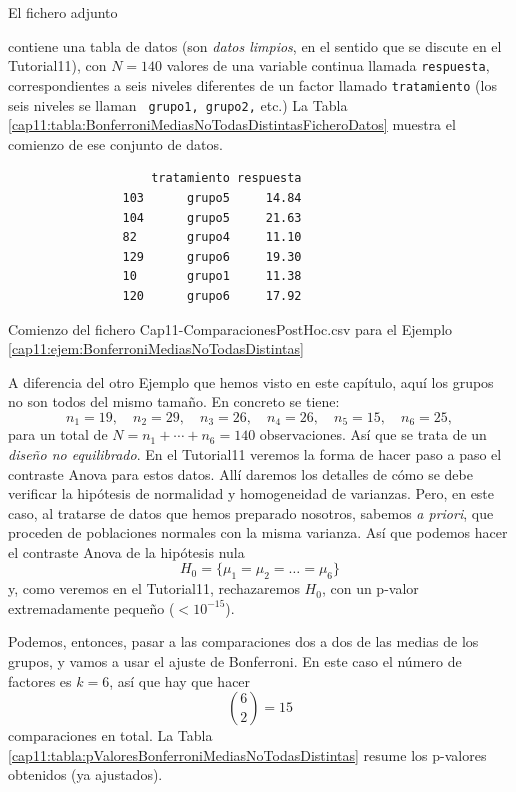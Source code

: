 \begin{ejemplo}
\label{cap11:ejem:BonferroniMediasNoTodasDistintas}

El fichero adjunto
\begin{center}
\end{center}
contiene una tabla de datos (son {\em datos limpios}, en el sentido que se discute en el
Tutorial11), con $N=140$ valores de una variable continua llamada {\tt respuesta}, correspondientes
a seis niveles diferentes de un factor llamado {\tt tratamiento} (los seis niveles se llaman {\tt
grupo1, grupo2,} etc.) La Tabla \ref{cap11:tabla:BonferroniMediasNoTodasDistintasFicheroDatos}
muestra el comienzo de ese conjunto de datos.

\begin{table}[ht]
\begin{verbatim}
                    tratamiento respuesta
                103      grupo5     14.84
                104      grupo5     21.63
                82       grupo4     11.10
                129      grupo6     19.30
                10       grupo1     11.38
                120      grupo6     17.92
\end{verbatim}
\caption{Comienzo del fichero {\sf Cap11-ComparacionesPostHoc.csv}
 para el Ejemplo \ref{cap11:ejem:BonferroniMediasNoTodasDistintas}}
\label{cap11:tabla:BonferroniMediasNoTodasDistintasFicheroDatos}
\end{table}

A diferencia del otro Ejemplo que hemos visto en este capítulo, aquí los grupos no son todos del
mismo tamaño. En concreto se tiene:
\[
n_1=19, \quad n_2=29,\quad  n_3=26,\quad n_4=26,\quad n_5=15,\quad n_6=25,
\]
para un total de $N=n_1+\cdots+n_6=140$ observaciones. Así que se trata de un {\em diseño no
equilibrado}. En el Tutorial11 veremos la forma de hacer paso a paso el contraste Anova para estos datos. Allí daremos los detalles de cómo se debe verificar la hipótesis de normalidad y homogeneidad de varianzas. Pero, en este caso, al tratarse de datos que hemos preparado nosotros, sabemos {\em a priori}, que proceden de poblaciones normales con la misma varianza. Así que podemos hacer el contraste Anova de la hipótesis nula
\[H_0=\{\mu_1=\mu_2=\dots=\mu_6\}\]
y, como veremos en el Tutorial11, rechazaremos $H_0$, con un p-valor extremadamente pequeño
($<10^{-15}$).

Podemos, entonces, pasar a las comparaciones dos a dos de las medias de los grupos, y vamos a usar
el ajuste de Bonferroni. En este caso el número de factores es $k=6$, así que hay que hacer
\[\binom{6}{2}=15\]
comparaciones en total. La Tabla \ref{cap11:tabla:pValoresBonferroniMediasNoTodasDistintas} resume
los p-valores obtenidos (ya ajustados).


\end{ejemplo}
